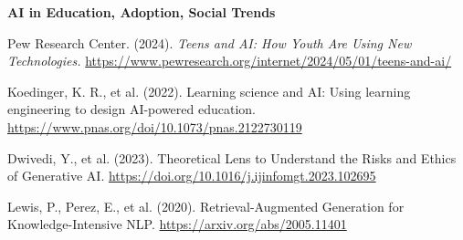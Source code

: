 \documentclass[11pt]{article}
\begin{document}
\textbf{AI in Education, Adoption, Social Trends}

\begin{list}{}{%
  \setlength{\leftmargin}{1.5em}
  \setlength{\itemindent}{-1.5em}
  \setlength{\itemsep}{0.3em}
}
\item Pew Research Center. (2024). \textit{Teens and AI: How Youth Are Using New
Technologies.} \url{https://www.pewresearch.org/internet/2024/05/01/teens-and-ai/}
\item Koedinger, K. R., et al. (2022). Learning science and AI: Using learning
engineering to design AI-powered education.
\url{https://www.pnas.org/doi/10.1073/pnas.2122730119}
\item Dwivedi, Y., et al. (2023). Theoretical Lens to Understand the Risks and
Ethics of Generative AI. \url{https://doi.org/10.1016/j.ijinfomgt.2023.102695}
\item Lewis, P., Perez, E., et al. (2020). Retrieval-Augmented Generation for
Knowledge-Intensive NLP. \url{https://arxiv.org/abs/2005.11401}
\end{list}
\end{document}

